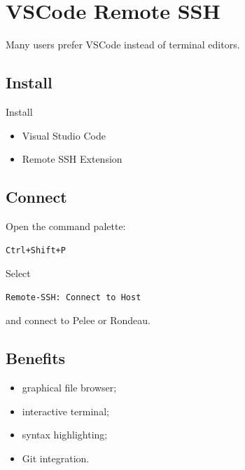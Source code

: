 \section{VSCode Remote SSH} 

Many users prefer VSCode instead of terminal editors. 

\subsection{Install} 

Install 

\begin{itemize} 
\item Visual Studio Code 
\item Remote SSH Extension 
\end{itemize} 

\subsection{Connect} 

Open the command palette: 

\begin{lstlisting} 
Ctrl+Shift+P 
\end{lstlisting} 

Select 

\begin{lstlisting} 
Remote-SSH: Connect to Host 
\end{lstlisting} 

and connect to Pelee or Rondeau. 

\subsection{Benefits} 

\begin{itemize} 
\item graphical file browser; 
\item interactive terminal; 
\item syntax highlighting; 
\item Git integration. 
\end{itemize}